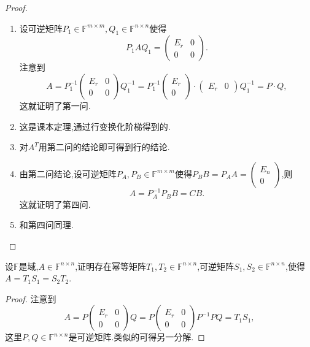 \documentclass[../../main.tex]{subfiles}%
\begin{document}
\begin{proof}
\begin{enumerate}
\item 设可逆矩阵\( P_1 \in \mathbb{F}^{m \times m}, Q_1 \in \mathbb{F}^{n \times n} \)使得
\[
P_1 A Q_1 = \begin{pmatrix} E_r & 0 \\ 0 & 0 \end{pmatrix}.
\]
注意到
\[
A = P_1^{-1} \begin{pmatrix} E_r & 0 \\ 0 & 0 \end{pmatrix} Q_1^{-1} = P_1^{-1} \begin{pmatrix} E_r \\ 0 \end{pmatrix} \cdot \begin{pmatrix} E_r & 0 \end{pmatrix} Q_1^{-1} = P \cdot Q,
\]
这就证明了第一问.

\item 这是课本定理,通过行变换化阶梯得到的.

\item 对\( A^T \)用第二问的结论即可得到行的结论.

\item 由第二问结论,设可逆矩阵\( P_A, P_B \in \mathbb{F}^{m \times m} \)使得\( P_B B = P_A A = \begin{pmatrix} E_n \\ 0 \end{pmatrix} \),则
\[
A = P_A^{-1} P_B B = CB.
\]
这就证明了第四问.

\item 和第四问同理.
\end{enumerate}
\end{proof}

\begin{theorem}[幂等分解]\label{theorem:幂等分解}
设\( \mathbb{F} \)是域,\( A \in \mathbb{F}^{n \times n} \),证明存在幂等矩阵\( T_1, T_2 \in \mathbb{F}^{n \times n} \),可逆矩阵\( S_1, S_2 \in \mathbb{F}^{n \times n} \),使得\( A = T_1 S_1 = S_2 T_2 \).
\end{theorem}
\begin{proof}
注意到
\[
A = P \begin{pmatrix} E_r & 0 \\ 0 & 0 \end{pmatrix} Q = P \begin{pmatrix} E_r & 0 \\ 0 & 0 \end{pmatrix} P^{-1} PQ = T_1 S_1,
\]
这里\( P, Q \in \mathbb{F}^{n \times n} \)是可逆矩阵.类似的可得另一分解.
\end{proof}
\end{document}
